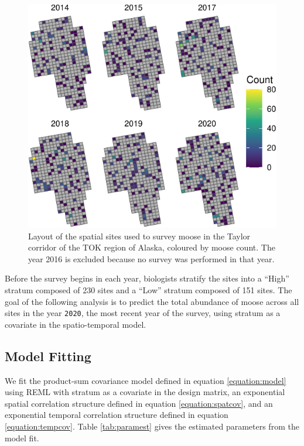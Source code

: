 \documentclass[]{interact}
\theoremstyle{plain}%
\theoremstyle{definition}
\theoremstyle{remark}
\begin{document}
\begin{figure}
\centering
\includegraphics{fpspatiotemp_manu_files/figure-latex/tokplotyears-1.pdf}
\caption{\label{fig:tokplotyears} Layout of the spatial sites used to
survey moose in the Taylor corridor of the TOK region of Alaska,
coloured by moose count. The year 2016 is excluded because no survey was
performed in that year.}
\end{figure}

Before the survey begins in each year, biologists stratify the sites
into a ``High'' stratum composed of 230 sites and a ``Low'' stratum
composed of 151 sites. The goal of the following analysis is to predict
the total abundance of moose across all sites in the year \texttt{2020},
the most recent year of the survey, using stratum as a covariate in the
spatio-temporal model.

\subsection{Model Fitting} \label{subsection:modelfit}

We fit the product-sum covariance model defined in equation
\ref{equation:model} using REML with stratum as a covariate in the
design matrix, an exponential spatial correlation structure defined in
equation \ref{equation:spatcov}, and an exponential temporal correlation
structure defined in equation \ref{equation:tempcov}. Table
\ref{tab:paramest} gives the estimated parameters from the model fit.
\end{document}
